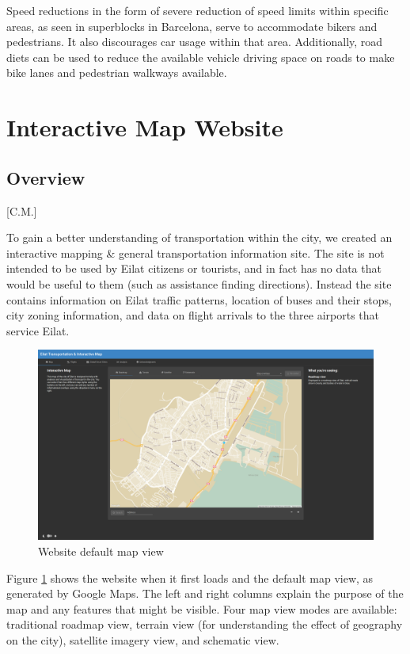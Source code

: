 \documentclass[12pt]{article}                       %
\begin{document}
Speed reductions in the form of severe reduction of speed limits within specific areas, as seen in superblocks in Barcelona, serve to accommodate bikers and pedestrians. It also discourages car usage within that area. Additionally, road diets can be used to reduce the available vehicle driving space on roads to make bike lanes and pedestrian walkways available.


\newpage
\section{Interactive Map Website}
\subsection{Overview}[C.M.]

To gain a better understanding of transportation within the city, we created an interactive mapping \& general transportation information site. The site is not intended to be used by Eilat citizens or tourists, and in fact has no data that would be useful to them (such as assistance finding directions). Instead the site contains information on Eilat traffic patterns, location of buses and their stops, city zoning information, and data on flight arrivals to the three airports that service Eilat. 

\begin{figure}[H]
    \centering
    \includegraphics[width=12cm]{images/site_map.png}
    \caption{Website default map view}
    \label{img:site_map}
\end{figure}

Figure \ref{img:site_map} shows the website when it first loads and the default map view, as generated by Google Maps. The left and right columns explain the purpose of the map and any features that might be visible. Four map view modes are available: traditional roadmap view, terrain view (for understanding the effect of geography on the city), satellite imagery view, and schematic view.
\end{document}
